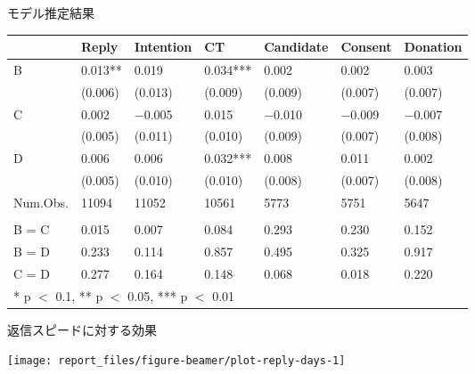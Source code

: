 \documentclass[
      aspectratio=169,
        12pt,
    ]{beamer}
\begin{document}
\begin{frame}{モデル推定結果}
\protect\hypertarget{ux30e2ux30c7ux30ebux63a8ux5b9aux7d50ux679c}{}
\begin{table}
\centering
\fontsize{9}{11}\selectfont
\begin{tabular}[t]{l>{\centering\arraybackslash}p{5em}>{\centering\arraybackslash}p{5em}>{\centering\arraybackslash}p{5em}>{\centering\arraybackslash}p{5em}>{\centering\arraybackslash}p{5em}>{\centering\arraybackslash}p{5em}}
\toprule
  & Reply & Intention & CT & Candidate & Consent & Donation\\
\midrule
B & \num{0.013}** & \num{0.019} & \num{0.034}*** & \num{0.002} & \num{0.002} & \num{0.003}\\
 & (\num{0.006}) & (\num{0.013}) & (\num{0.009}) & (\num{0.009}) & (\num{0.007}) & (\num{0.007})\\
C & \num{0.002} & \num{-0.005} & \num{0.015} & \num{-0.010} & \num{-0.009} & \num{-0.007}\\
 & (\num{0.005}) & (\num{0.011}) & (\num{0.010}) & (\num{0.009}) & (\num{0.007}) & (\num{0.008})\\
D & \num{0.006} & \num{0.006} & \num{0.032}*** & \num{0.008} & \num{0.011} & \num{0.002}\\
 & (\num{0.005}) & (\num{0.010}) & (\num{0.010}) & (\num{0.008}) & (\num{0.007}) & (\num{0.008})\\
\midrule
Num.Obs. & \num{11094} & \num{11052} & \num{10561} & \num{5773} & \num{5751} & \num{5647}\\
\addlinespace[0.3em]
\multicolumn{7}{l}{\textit{F-tests, p-value}}\\
\hspace{1em}B = C & \num{0.015} & \num{0.007} & \num{0.084} & \num{0.293} & \num{0.230} & \num{0.152}\\
\hspace{1em}B = D & \num{0.233} & \num{0.114} & \num{0.857} & \num{0.495} & \num{0.325} & \num{0.917}\\
\hspace{1em}C = D & \num{0.277} & \num{0.164} & \num{0.148} & \num{0.068} & \num{0.018} & \num{0.220}\\
\bottomrule
\multicolumn{7}{l}{\rule{0pt}{1em}* p $<$ 0.1, ** p $<$ 0.05, *** p $<$ 0.01}\\
\end{tabular}
\end{table}
\end{frame}

\begin{frame}{返信スピードに対する効果}
\protect\hypertarget{ux8fd4ux4fe1ux30b9ux30d4ux30fcux30c9ux306bux5bfeux3059ux308bux52b9ux679c}{}
\begin{center}\texttt{[image: report\_files/figure-beamer/plot-reply-days-1]} \end{center}
\end{frame}
\end{document}
